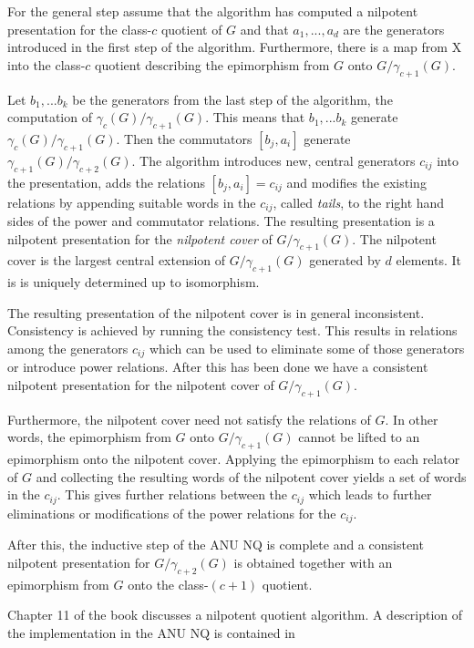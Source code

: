 \documentclass[a4paper,11pt]{report}
\begin{document}
{{For the general step assume that the algorithm has computed a nilpotent
presentation for the class-$c$ quotient of $G$ and that $a_1,...,a_d$ are the generators introduced in the first step of the algorithm. Furthermore,
there is a map from X into the class-$c$ quotient describing the epimorphism from $G$ onto $G/\gamma_{c+1}(G)$. 

Let $b_1,...b_k$ be the generators from the last step of the algorithm, the computation of $\gamma_c(G)/\gamma_{c+1}(G)$. This means that $b_1,...b_k$ generate $\gamma_c(G)/\gamma_{c+1}(G)$. Then the commutators $[b_j,a_i]$ generate $\gamma_{c+1}(G)/\gamma_{c+2}(G)$. The algorithm introduces new, central generators $c_{ij}$ into the presentation, adds the relations $[b_j,a_i] = c_{ij}$ and modifies the existing relations by appending suitable words in the $c_{ij}$, called \emph{tails}, to the right hand sides of the power and commutator relations. The resulting
presentation is a nilpotent presentation for the \emph{nilpotent cover} of $G/\gamma_{c+1}(G)$. The nilpotent cover is the largest central extension of $G/\gamma_{c+1}(G)$ generated by $d$ elements. It is is uniquely determined up to isomorphism. 

The resulting presentation of the nilpotent cover is in general inconsistent.
Consistency is achieved by running the consistency test. This results in
relations among the generators $c_{ij}$ which can be used to eliminate some of those generators or introduce power
relations. After this has been done we have a consistent nilpotent
presentation for the nilpotent cover of $G/\gamma_{c+1}(G)$. 

Furthermore, the nilpotent cover need not satisfy the relations of $G$. In other words, the epimorphism from $G$ onto $G/\gamma_{c+1}(G)$ cannot be lifted to an epimorphism onto the nilpotent cover. Applying the
epimorphism to each relator of $G$ and collecting the resulting words of the nilpotent cover yields a set of
words in the $c_{ij}$. This gives further relations between the $c_{ij}$ which leads to further eliminations or modifications of the power relations
for the $c_{ij}$. 

After this, the inductive step of the ANU NQ is complete and a consistent
nilpotent presentation for $G/\gamma_{c+2}(G)$ is obtained together with an epimorphism from $G$ onto the class-$(c+1)$ quotient. 

Chapter 11 of the book \cite{Sims94} discusses a nilpotent quotient algorithm. A description of the implementation
in the ANU NQ is contained in \cite{Nickel96} }

}
\end{document}

